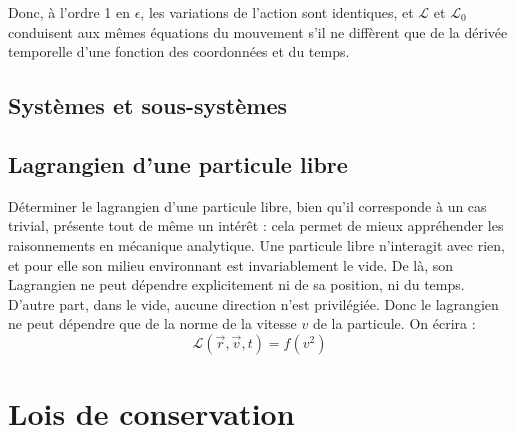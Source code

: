 Donc, à l'ordre 1 en $\epsilon$, les variations de l'action sont identiques, et $\mathcal{L}$ et $\mathcal{L}_0$ conduisent aux mêmes équations du mouvement s'il ne diffèrent que de la dérivée temporelle d'une fonction des coordonnées et du temps.

\subsection{Systèmes et sous-systèmes}


\subsection{Lagrangien d'une particule libre}

Déterminer le lagrangien d'une particule libre, bien qu'il corresponde à un cas trivial, présente tout de même un intérêt : cela permet de mieux appréhender les raisonnements en mécanique analytique.
Une particule libre n'interagit avec rien, et pour elle son milieu environnant est invariablement le vide. De là, son Lagrangien ne peut dépendre explicitement ni de sa position, ni du temps.
D'autre part, dans le vide, aucune direction n'est privilégiée. Donc le lagrangien ne peut dépendre que de la norme de la vitesse $v$ de la particule. On écrira :
\begin{equation}
\mathcal{L}(\vec{r}, \vec{v}, t) = f(v^2)
\end{equation}


\section{Lois de conservation}

%
%
%

